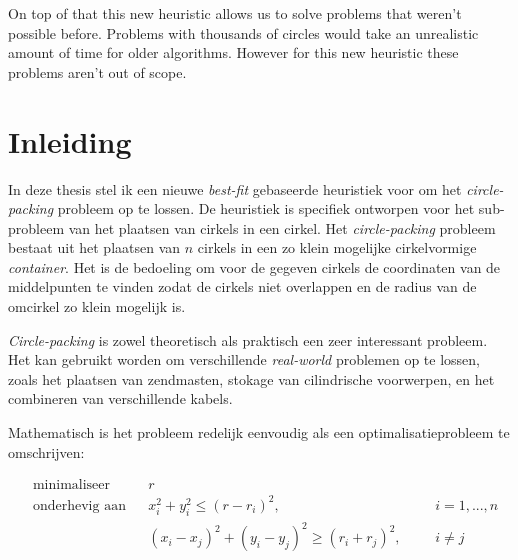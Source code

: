 \documentclass[12pt,a4paper,oneside]{book}
\begin{document}
On top of that this new heuristic allows us to solve problems that weren't possible before.
Problems with thousands of circles would take an unrealistic amount of time for older algorithms.
However for this new heuristic these problems aren't out of scope.

\newpage

\tableofcontents
\listoffigures
{}
\listoftables
{}

\newpage

\setcounter{page}{0}

\chapter{Inleiding}

In deze thesis stel ik een nieuwe \textit{best-fit} gebaseerde heuristiek voor om het \textit{circle-packing} probleem op te lossen.
De heuristiek is specifiek ontworpen voor het sub-probleem van het plaatsen van cirkels in een cirkel.
Het \textit{circle-packing} probleem bestaat uit het plaatsen van $n$ cirkels in een zo klein mogelijke cirkelvormige \textit{container}.
Het is de bedoeling om voor de gegeven cirkels de coordinaten van de middelpunten te vinden zodat de cirkels niet overlappen en de radius van de omcirkel zo klein mogelijk is.

\textit{Circle-packing} is zowel theoretisch als praktisch een zeer interessant probleem.
Het kan gebruikt worden om verschillende \textit{real-world} problemen op te lossen, zoals het plaatsen van zendmasten, stokage van cilindrische voorwerpen, en het combineren van verschillende kabels. 

Mathematisch is het probleem redelijk eenvoudig als een optimalisatieprobleem te omschrijven:

\begin{equation*}
\begin{aligned}
& \text{minimaliseer}
& & r \\
& \text{onderhevig aan}
& & x_i^2 + y_i^2 \leq (r-r_i)^2, 
& & &i = {1,...,n}\\
&&& (x_i - x_j)^2 + (y_i - y_j)^2 \geq (r_i + r_j)^2,
& & &i \neq j
\end{aligned}
\end{equation*}
\end{document}
